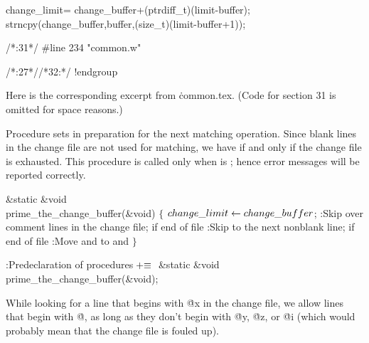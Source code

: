 {{{
change_limit= change_buffer+(ptrdiff_t)(limit-buffer);
strncpy(change_buffer,buffer,(size_t)(limit-buffer+1));
}

/*:31*/
#line 234 "common.w"

}

/*:27*//*32:*/
!endgroup
\endgroup
\vfill\eject

\def\runninghead{APPENDIX A --- TRANSLATION BY {\tentt CWEAVE}}

Here is the corresponding excerpt from \.{common.tex}.
(Code for section 31 is omitted for space reasons.)

\vskip6pt
\begingroup \def\tt{\eighttt} \baselineskip9pt
\verbatim
{}Procedure 
sets  in preparation for the next matching operation.
Since blank lines in the change file are not used for matching, we have
 if and only if
the change file is exhausted. This procedure is called only when
 is ; hence error messages will be reported
correctly.

\Y\B\1\1\&{static} \&{void} \\{prime\_the\_change\_buffer}(\&{void})\2\2\6
${}\{{}$\1\6
${}\\{change\_limit}\leftarrow\\{change\_buffer}{}$;\6
:Skip over comment lines in the change file;  if end of file%
\X\6
:Skip to the next nonblank line;  if end of file\X\6
:Move  and  to  and %
\X\6
\4${}\}{}$\2\par
\fi

\B{}:Predeclaration of procedures\X${}\mathrel+\equiv{}$\5
\&{static} \&{void} \\{prime\_the\_change\_buffer}(\&{void});\par
\fi

While looking for a line that begins with \.{@x} in the change file, we
allow lines that begin with \.{@}, as long as they don't begin with \.{@y},
\.{@z}, or \.{@i} (which would probably mean that the change file is fouled
up).

}
